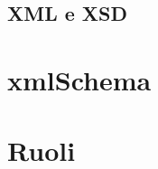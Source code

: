 \documentclass[12pt]{article}
\begin{document}
	\subsection{XML e XSD}

\section{xmlSchema}



\section{Ruoli}

	


\newpage
\end{document}
